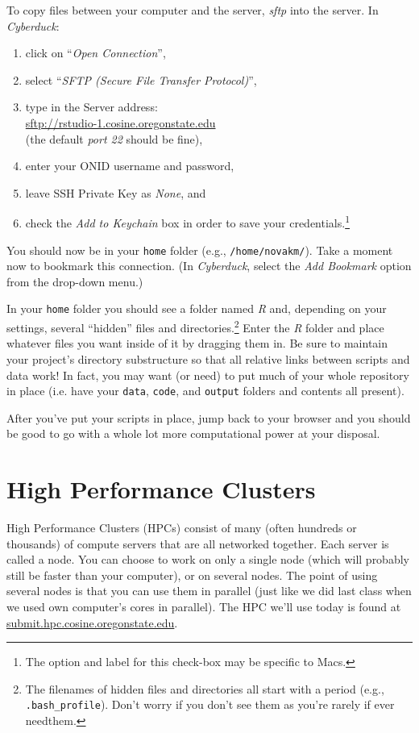 \documentclass[12pt,letterpaper]{article}
\begin{document}
To copy files between your computer and the server, \emph{sftp} into the server.
In \emph{Cyberduck}:
\begin{enumerate}
	\item click on ``\emph{Open Connection}'',
	\item select ``\emph{SFTP (Secure File Transfer Protocol)}'',
	\item type in the Server address:\\
		 \url{sftp://rstudio-1.cosine.oregonstate.edu}\\
		 (the default \emph{port 22} should be fine),
	\item enter your ONID username and password,
	\item leave SSH Private Key as \emph{None}, and
	\item check the \emph{Add to Keychain} box in order to save your credentials.\footnote{The option and label for this check-box may be specific to Macs.}
\end{enumerate}

You should now be in your \texttt{home} folder (e.g., \texttt{/home/novakm/}).
Take a moment now to bookmark this connection.
(In \emph{Cyberduck}, select the \emph{Add Bookmark} option from the drop-down menu.)

In your \texttt{home} folder you should see a folder named \emph{R} and, depending on your settings,
several ``hidden'' files and directories.\footnote{The filenames of hidden files and directories all start with a period (e.g., \texttt{.bash\_profile}).
Don't worry if you don't see them as you're rarely if ever needthem.}
Enter the \emph{R} folder and place whatever files you want inside of it by dragging them in.
Be sure to maintain your project's directory substructure so that all relative links between scripts and data work!
In fact, you may want (or need) to put much of your whole repository in place (i.e. have your \texttt{data}, \texttt{code}, and \texttt{output} folders and contents all present).


After you've put your scripts in place, jump back to your browser and you should be good to go with a whole lot more computational power at your disposal.


\section{High Performance Clusters}

High Performance Clusters (HPCs) consist of many (often hundreds or thousands) of compute servers that are all networked together.
Each server is called a node.
You can choose to work on only a single node (which will probably still be faster than your computer), or on several nodes.
The point of using several nodes is that you can use them in parallel (just like we did last class when we used own computer's cores in parallel).
The HPC we'll use today is found at \url{submit.hpc.cosine.oregonstate.edu}.
\end{document}

